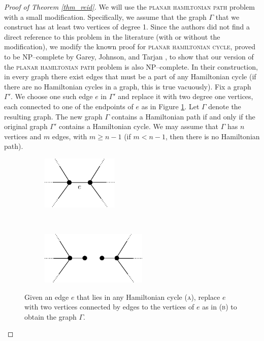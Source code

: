 \documentclass[12pt]{amsart}
\theoremstyle{definition}
\theoremstyle{remark}
\begin{document}
\begin{proof}[Proof of Theorem \ref{thm_reid}]
We will use the \textsc{planar hamiltonian path} problem with a small modification.
Specifically, we assume that the graph $\Gamma$ that we construct has at least two vertices of degree 1.
Since the authors did not find a direct reference to this problem in the literature (with or without the modification), we modify the known proof for \textsc{planar hamiltonian cycle}, proved to be NP--complete by Garey, Johnson, and Tarjan \cite{GareyJohnsonTarjan1}, to show that our version of the \textsc{planar hamiltonian path} problem is also NP--complete.
In their construction, in every graph there exist edges that must be a part of any Hamiltonian cycle (if there are no Hamiltonian cycles in a graph, this is true vacuously).
Fix a graph $\Gamma'$.
We choose one such edge $e$ in $\Gamma'$ and replace it with two degree one vertices, each connected to one of the endpoints of $e$ as in Figure \ref{edgerep}.
Let $\Gamma$ denote the resulting graph.
The new graph $\Gamma$ contains a Hamiltonian path if and only if the original graph $\Gamma'$ contains a Hamiltonian cycle.
We may assume that $\Gamma$ has $n$ vertices and $m$ edges, with $m \ge n-1$ (if $m < n-1$, then there is no Hamiltonian path).


\begin{figure}[ht]
\centering
    \begin{subfigure}[b]{0.4\textwidth}
        \centering
        \includegraphics[height=1.0in]{edgerep1.png}
        \caption{}
    \end{subfigure}%
~~~~~
    \begin{subfigure}[b]{0.5\textwidth}
        \centering
        \includegraphics[height=1.0in]{edgerep2.png}
        \caption{}
    \end{subfigure}
\caption{Given an edge $e$ that lies in any Hamiltonian cycle (\textsc{a}), replace $e$ with two vertices connected by edges to the vertices of $e$ as in (\textsc{b}) to obtain the graph $\Gamma$.}
\label{edgerep}


\end{figure}
\end{proof}
\end{document}
